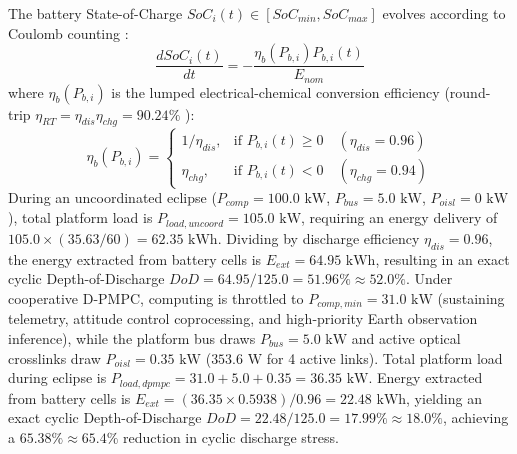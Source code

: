 \documentclass[journal]{IEEEtran}
\begin{document}
The battery State-of-Charge $SoC_i(t) \in [SoC_{min}, SoC_{max}]$ evolves according to Coulomb counting \cite{li2024battery, xu2018modeling}:
\begin{equation}
    \frac{d SoC_i(t)}{dt} = - \frac{\eta_b(P_{b,i}) P_{b,i}(t)}{E_{nom}}
    \label{eq:soc_dynamics}
\end{equation}
where $\eta_b(P_{b,i})$ is the lumped electrical-chemical conversion efficiency (round-trip $\eta_{RT} = \eta_{dis} \eta_{chg} = 90.24\%$ \cite{patel2005spacecraft, li2024battery}):
\begin{equation}
    \eta_b(P_{b,i}) = 
    \begin{cases}
        1 / \eta_{dis}, & \text{if } P_{b,i}(t) \ge 0 \quad (\eta_{dis} = 0.96) \\
        \eta_{chg}, & \text{if } P_{b,i}(t) < 0 \quad (\eta_{chg} = 0.94)
    \end{cases}
\end{equation}
During an uncoordinated eclipse ($P_{comp} = 100.0\text{ kW}$, $P_{bus} = 5.0\text{ kW}$, $P_{oisl} = 0\text{ kW}$), total platform load is $P_{load,uncoord} = 105.0\text{ kW}$, requiring an energy delivery of $105.0 \times (35.63/60) = 62.35\text{ kWh}$. Dividing by discharge efficiency $\eta_{dis} = 0.96$, the energy extracted from battery cells is $E_{ext} = 64.95\text{ kWh}$, resulting in an exact cyclic Depth-of-Discharge $DoD = 64.95 / 125.0 = 51.96\% \approx 52.0\%$. Under cooperative D-PMPC, computing is throttled to $P_{comp,min} = 31.0\text{ kW}$ (sustaining telemetry, attitude control coprocessing, and high-priority Earth observation inference), while the platform bus draws $P_{bus} = 5.0\text{ kW}$ and active optical crosslinks draw $P_{oisl} = 0.35\text{ kW}$ ($353.6\text{ W}$ for 4 active links). Total platform load during eclipse is $P_{load,dpmpc} = 31.0 + 5.0 + 0.35 = 36.35\text{ kW}$. Energy extracted from battery cells is $E_{ext} = (36.35 \times 0.5938) / 0.96 = 22.48\text{ kWh}$, yielding an exact cyclic Depth-of-Discharge $DoD = 22.48 / 125.0 = 17.99\% \approx 18.0\%$, achieving a $65.38\% \approx 65.4\%$ reduction in cyclic discharge stress.
\end{document}
